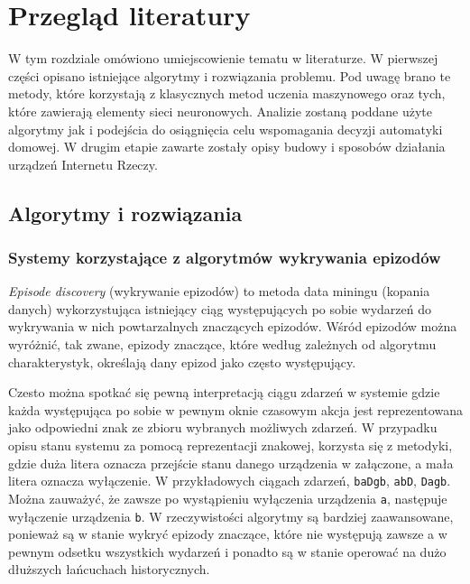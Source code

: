 
\chapter{Przegląd literatury}


W tym rozdziale omówiono umiejscowienie tematu w literaturze. W pierwszej części opisano istniejące algorytmy i rozwiązania problemu. Pod uwagę brano te metody, które korzystają z klasycznych metod uczenia maszynowego oraz tych, które zawierają elementy sieci neuronowych. Analizie zostaną poddane użyte algorytmy jak i podejścia do osiągnięcia celu wspomagania decyzji automatyki domowej. W drugim etapie zawarte zostały opisy budowy i sposobów działania urządzeń Internetu Rzeczy.

\section{Algorytmy i rozwiązania}
\subsection{Systemy korzystające z algorytmów wykrywania epizodów}
\label{subsec:episode_discovery}
\textit{Episode discovery} (wykrywanie epizodów) to metoda data miningu (kopania danych) wykorzystująca istniejący ciąg występujących po sobie wydarzeń do wykrywania w nich powtarzalnych znaczących epizodów. Wśród epizodów można wyróżnić, tak zwane, epizody znaczące, które według zależnych od algorytmu charakterystyk, określają dany epizod jako często występujący.

Czesto można spotkać się pewną interpretacją ciągu zdarzeń w systemie gdzie każda występująca po sobie w pewnym oknie czasowym akcja jest reprezentowana jako odpowiedni znak ze zbioru wybranych możliwych zdarzeń. W przypadku opisu stanu systemu za pomocą reprezentacji znakowej, korzysta się z metodyki, gdzie duża litera oznacza przejście stanu danego urządzenia w załączone, a mała litera oznacza wyłączenie. W przykładowych ciągach zdarzeń, \verb|baDgb|, \verb|abD|, \verb|Dagb|. Można zauważyć, że zawsze po wystąpieniu wyłączenia urządzenia \verb|a|, następuje wyłączenie urządzenia \verb|b|. W rzeczywistości algorytmy są bardziej zaawansowane, ponieważ są w stanie wykryć epizody znaczące, które nie występują zawsze a w pewnym odsetku wszystkich wydarzeń i ponadto są w stanie operować na dużo dłuższych łańcuchach historycznych.


